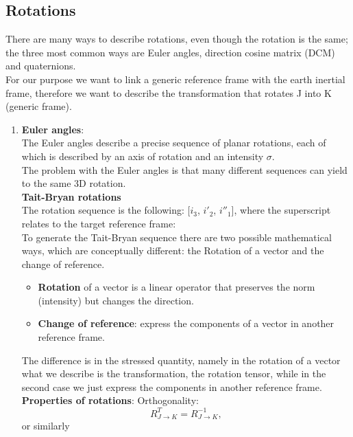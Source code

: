 \subsection{Rotations}
There are many ways to describe rotations, even though the rotation is the same; the three most common ways are Euler angles, direction cosine matrix (DCM) and quaternions.
\\
For our purpose we want to link a generic reference frame with the earth inertial frame, therefore we want to describe the transformation that rotates J into K (generic frame).
\begin{enumerate}
    \item \textbf{Euler angles}:\\
    The Euler angles describe a precise sequence of planar rotations, each of which is described by an axis of rotation and an intensity $\sigma$.
    \\
    The problem with the Euler angles is that many different sequences can yield to the same 3D rotation.
    \\
    \textbf{Tait-Bryan rotations}\\
    The rotation sequence is the following: [$i_3$, $i'_2$, $i''_1$], where the superscript relates to the target reference frame: 
    \\
    To generate the Tait-Bryan sequence there are two possible mathematical ways, which are conceptually different: the Rotation of a vector and the change of reference.
    \\
    \begin{itemize}
        \item \textbf{Rotation} of a vector is a linear operator that preserves the norm (intensity) but changes the direction. 
        \item \textbf{Change of reference}: express the components of a vector in another reference frame.        
    \end{itemize}
    The difference is in the stressed quantity, namely in the rotation of a vector what we describe is the transformation, the rotation tensor, while in the second case we just express the components in another reference frame.
    \\
    \textbf{Properties of rotations}: 
        Orthogonality:
        \begin{equation}
            R^T_{J\to K} = R^{-1}_{J\to K},
        \end{equation}
        or similarly
        \begin{equation}

\end{equation}
\end{enumerate}
